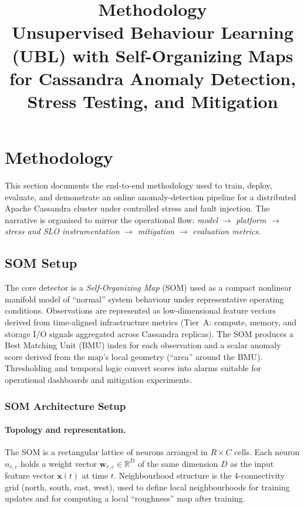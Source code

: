 \documentclass[11pt,a4paper]{article}
\title{\textbf{Methodology}\\[0.35em]
\large Unsupervised Behaviour Learning (UBL) with Self-Organizing Maps\\
for Cassandra Anomaly Detection, Stress Testing, and Mitigation}
\author{}
\date{}
\begin{document}
\maketitle
\tableofcontents
\newpage

\section{Methodology}
\label{sec:methodology}

This section documents the end-to-end methodology used to train, deploy, evaluate, and demonstrate an online anomaly-detection pipeline for a distributed Apache Cassandra cluster under controlled stress and fault injection. The narrative is organised to mirror the operational flow: \emph{model} $\rightarrow$ \emph{platform} $\rightarrow$ \emph{stress and SLO instrumentation} $\rightarrow$ \emph{mitigation} $\rightarrow$ \emph{evaluation metrics}.

\subsection{SOM Setup}
\label{subsec:som-setup}

The core detector is a \emph{Self-Organizing Map} (SOM) used as a compact nonlinear manifold model of ``normal'' system behaviour under representative operating conditions. Observations are represented as low-dimensional feature vectors derived from time-aligned infrastructure metrics (Tier~A: compute, memory, and storage I/O signals aggregated across Cassandra replicas). The SOM produces a Best Matching Unit (BMU) index for each observation and a scalar anomaly score derived from the map's local geometry (``area'' around the BMU). Thresholding and temporal logic convert scores into alarms suitable for operational dashboards and mitigation experiments.

\subsubsection{SOM Architecture Setup}
\label{subsubsec:som-arch}

\paragraph{Topology and representation.}
The SOM is a rectangular lattice of neurons arranged in $R \times C$ cells. Each neuron $n_{r,c}$ holds a weight vector $\mathbf{w}_{r,c} \in \mathbb{R}^D$ of the same dimension $D$ as the input feature vector $\mathbf{x}(t)$ at time $t$. Neighbourhood structure is the 4-connectivity grid (north, south, east, west), used to define local neighbourhoods for training updates and for computing a local ``roughness'' map after training.
\end{document}
